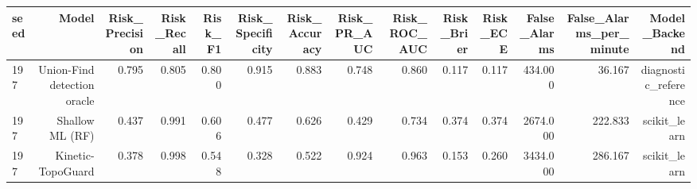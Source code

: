 \begin{tabular}{lrrrrrrrrrrrrr}
\toprule
seed & Model & Risk\_Precision & Risk\_Recall & Risk\_F1 & Risk\_Specificity & Risk\_Accuracy & Risk\_PR\_AUC & Risk\_ROC\_AUC & Risk\_Brier & Risk\_ECE & False\_Alarms & False\_Alarms\_per\_minute & Model\_Backend \\
\midrule
197 & Union-Find detection oracle & 0.795 & 0.805 & 0.800 & 0.915 & 0.883 & 0.748 & 0.860 & 0.117 & 0.117 & 434.000 & 36.167 & diagnostic\_reference \\
197 & Shallow ML (RF) & 0.437 & 0.991 & 0.606 & 0.477 & 0.626 & 0.429 & 0.734 & 0.374 & 0.374 & 2674.000 & 222.833 & scikit\_learn \\
197 & Kinetic-TopoGuard & 0.378 & 0.998 & 0.548 & 0.328 & 0.522 & 0.924 & 0.963 & 0.153 & 0.260 & 3434.000 & 286.167 & scikit\_learn \\
\bottomrule
\end{tabular}